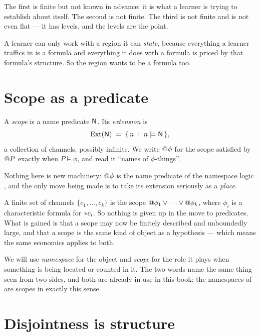 \noindent
The first is finite but not known in advance; it is what a learner is
trying to establish about itself. The second is not finite. The third is
not finite and is not even flat --- it has levels, and the levels are the
point.

A learner can only work with a region it can \emph{state}, because
everything a learner traffics in is a formula and everything it does with
a formula is priced by that formula's structure. So the region wants to be
a formula too.

\section{Scope as a predicate}

\begin{definition}[Scope]
\label{sco:def:scope}
A \emph{scope} is a name predicate $\mathsf{N}$. Its \emph{extension} is
\[
  \mathrm{Ext}(\mathsf{N}) \;=\; \{\, n \;:\; n \models \mathsf{N} \,\},
\]
a collection of channels, possibly infinite. We write $@\phi$ for the
scope satisfied by $@P$ exactly when $P \models \phi$, and read it
``names of $\phi$-things''.
\end{definition}

Nothing here is new machinery: $@\phi$ is the name predicate of the
namespace logic \cite{NamespaceLogic}, and the only move being made is to
take its extension seriously as a \emph{place}.

\begin{remark}
\label{sco:rmk:flat}
A finite set of channels $\{c_1,\dots,c_k\}$ is the scope
$@\phi_1 \lor \dots \lor @\phi_k$, where $\phi_i$ is a
characteristic formula for $*c_i$. So nothing is given up in the
move to predicates. What is gained is that a scope may now be finitely
described and unboundedly large, and that a scope is the same kind of
object as a hypothesis --- which means the same economics applies to both.
\end{remark}

We will use \emph{namespace} for the object and \emph{scope} for the role
it plays when something is being located or counted in it. The two words
name the same thing seen from two sides, and both are already in use in
this book: the namespaces of \chComp are scopes in exactly this sense.

\section{Disjointness is structure}

